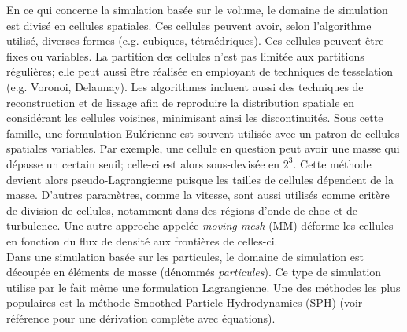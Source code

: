 \documentclass{article}
\begin{document}
En ce qui concerne la simulation basée sur le volume, le domaine de simulation est divisé en cellules spatiales. Ces cellules peuvent avoir, selon l'algorithme utilisé, diverses formes (e.g. cubiques, tétraédriques). Ces cellules peuvent être  fixes ou variables. La partition des cellules n'est pas limitée aux partitions régulières; elle peut aussi être réalisée en employant de techniques de tesselation (e.g. Voronoi, Delaunay). Les algorithmes incluent aussi des techniques de  reconstruction et de lissage afin de reproduire la distribution spatiale  en considérant les cellules voisines, minimisant ainsi les discontinuités. Sous cette famille, une formulation Eulérienne est souvent utilisée avec un patron de cellules spatiales variables. Par exemple, une cellule en question peut avoir une masse qui dépasse un certain seuil; celle-ci est alors sous-devisée en $2^3$. Cette méthode devient alors pseudo-Lagrangienne puisque les tailles de cellules dépendent de la masse. D'autres paramètres, comme la vitesse, sont aussi utilisés comme critère de division de cellules, notamment dans des régions d'onde de choc et de turbulence. Une autre approche appelée \textit{moving mesh} (MM) déforme les cellules en fonction du flux de densité aux frontières de celles-ci. \\

Dans une simulation basée sur les particules, le domaine de simulation est découpée en éléments de masse (dénommés \textit{particules}). Ce type de simulation utilise par le fait même une formulation Lagrangienne. Une des méthodes les plus populaires est la méthode  Smoothed Particle Hydrodynamics (SPH) (voir référence \cite{Hopkins_2012} pour une dérivation complète avec équations). 
\end{document}
